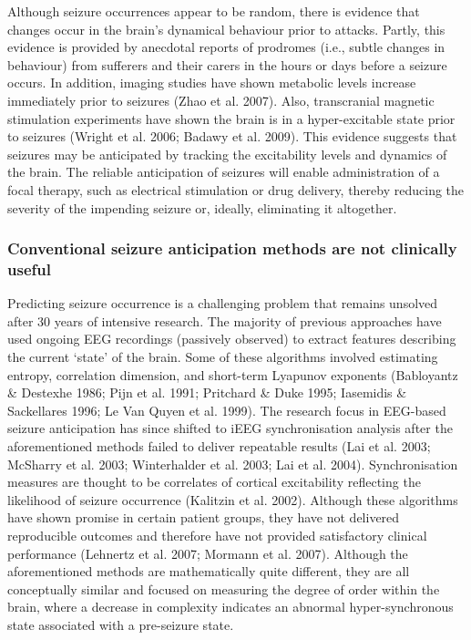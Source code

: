 \documentclass[]{article}
\begin{document}
Although seizure occurrences appear to be random, there is evidence that changes occur in the brain’s dynamical behaviour prior to attacks. Partly, this evidence is provided by anecdotal reports of prodromes (i.e., subtle changes in behaviour) from sufferers and their carers in the hours or days before a seizure occurs. In addition, imaging studies have shown metabolic levels increase immediately prior to seizures (Zhao et al. 2007). Also, transcranial magnetic stimulation experiments have shown the brain is in a hyper-excitable state prior to seizures (Wright et al. 2006; Badawy et al. 2009). This evidence suggests that seizures may be anticipated by tracking the excitability levels and dynamics of the brain. The reliable anticipation of seizures will enable administration of a focal therapy, such as electrical stimulation or drug delivery, thereby reducing the severity of the impending seizure or, ideally, eliminating it altogether. 

\subsubsection{Conventional seizure anticipation methods are not clinically useful}
Predicting seizure occurrence is a challenging problem that remains unsolved after 30 years of intensive research. The majority of previous approaches have used ongoing EEG recordings (passively observed) to extract features describing the current ‘state’ of the brain. Some of these algorithms involved estimating entropy, correlation dimension, and short-term Lyapunov exponents (Babloyantz \& Destexhe 1986; Pijn et al. 1991; Pritchard \& Duke 1995; Iasemidis \& Sackellares 1996; Le Van Quyen et al. 1999). 
The research focus in EEG-based seizure anticipation has since shifted to iEEG synchronisation analysis after the aforementioned methods failed to deliver repeatable results (Lai et al. 2003; McSharry et al. 2003; Winterhalder et al. 2003; Lai et al. 2004). Synchronisation measures are thought to be correlates of cortical excitability reflecting the likelihood of seizure occurrence (Kalitzin et al. 2002). Although these algorithms have shown promise in certain patient groups, they have not delivered reproducible outcomes and therefore have not provided satisfactory clinical performance (Lehnertz et al. 2007; Mormann et al. 2007). 
Although the aforementioned methods are mathematically quite different, they are all conceptually similar and focused on measuring the degree of order within the brain, where a decrease in complexity indicates an abnormal hyper-synchronous state associated with a pre-seizure state. 
\end{document}
